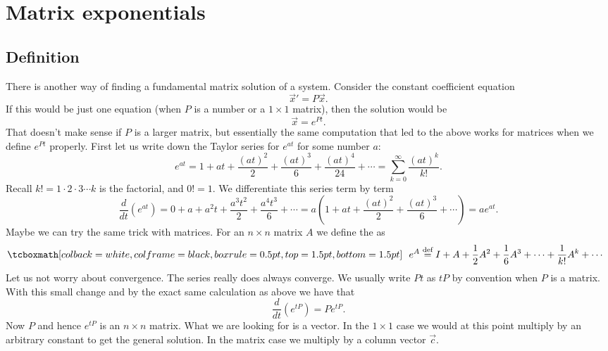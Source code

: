 
\sectionnewpage
\section{Matrix exponentials} \label{sec:matexp}


\subsection{Definition}

There is another way of finding a fundamental
matrix solution of a system.  Consider the constant
coefficient equation
\begin{equation*}
{\vec{x}}' = P \vec{x} .
\end{equation*}
If this would be just one equation (when $P$ is a number or a $1
\times 1$ matrix), then the solution would be
\begin{equation*}
\vec{x} = e^{Pt} .
\end{equation*}
That doesn't make sense if $P$ is a larger matrix, but
essentially the same computation that led to the above
works for matrices when we define
$e^{Pt}$ properly.  First let us write down the Taylor series for $e^{at}$
for some number $a$:
\begin{equation*}
e^{at} = 1 + at
+ \frac{{(at)}^2}{2}
+ \frac{{(at)}^3}{6}
+ \frac{{(at)}^4}{24}
+ \cdots
= \sum_{k=0}^\infty \frac{{(at)}^k}{k!} .
\end{equation*}
Recall $k! = 1 \cdot 2 \cdot 3 \cdots k$ is the factorial, and $0! = 1$.
We differentiate this series term by term
\begin{equation*}
\frac{d}{dt} \left(e^{at} \right) = 
0
+ a
+ a^2 t
+ \frac{a^3t^2}{2}
+ \frac{a^4t^3}{6}
+ \cdots
= a \left(
1
+ a t
+ \frac{{(at)}^2}{2}
+ \frac{{(at)}^3}{6}
+ \cdots \right)
= a e^{at}.
\end{equation*}
Maybe we can try the same trick with matrices.  For an $n \times n$
matrix $A$ we define the
\emph{} as
\begin{equation*}
\mybxbg{~~
e^A \overset{\text{def}}{=} I + A + \frac{1}{2} A^2 + 
\frac{1}{6} A^3 + \cdots + \frac{1}{k!} A^k + \cdots
~~}
\end{equation*}
Let us not worry about convergence.  The series really does
always converge.
We usually write $Pt$ as $tP$ by convention when $P$ is a matrix.
With this small change and by the exact same
calculation as above
we have that
\begin{equation*}
\frac{d}{dt} \left(e^{tP} \right) = 
P e^{tP} .
\end{equation*}
Now $P$ and hence $e^{tP}$ is an $n \times n$ matrix.  What we are looking
for is a vector.  In the $1 \times 1$ case we would at this
point multiply by an arbitrary constant to get the general solution.  In the
matrix case we multiply by a column vector $\vec{c}$.

